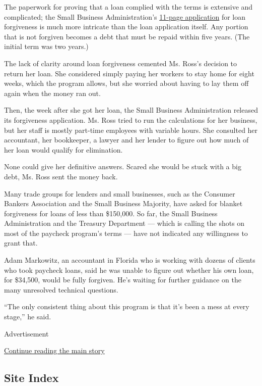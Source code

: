The paperwork for proving that a loan complied with the terms is
extensive and complicated; the Small Business Administration's
\href{https://www.sba.gov/sites/default/files/2020-05/3245-0407\%20SBA\%20Form\%203508\%20PPP\%20Forgiveness\%20Application.pdf}{11-page
application} for loan forgiveness is much more intricate than the loan
application itself. Any portion that is not forgiven becomes a debt that
must be repaid within five years. (The initial term was two years.)

The lack of clarity around loan forgiveness cemented Ms. Ross's decision
to return her loan. She considered simply paying her workers to stay
home for eight weeks, which the program allows, but she worried about
having to lay them off again when the money ran out.

Then, the week after she got her loan, the Small Business Administration
released its forgiveness application. Ms. Ross tried to run the
calculations for her business, but her staff is mostly part-time
employees with variable hours. She consulted her accountant, her
bookkeeper, a lawyer and her lender to figure out how much of her loan
would qualify for elimination.

None could give her definitive answers. Scared she would be stuck with a
big debt, Ms. Ross sent the money back.

Many trade groups for lenders and small businesses, such as the Consumer
Bankers Association and the Small Business Majority, have asked for
blanket forgiveness for loans of less than \$150,000. So far, the Small
Business Administration and the Treasury Department --- which is calling
the shots on most of the paycheck program's terms --- have not indicated
any willingness to grant that.

Adam Markowitz, an accountant in Florida who is working with dozens of
clients who took paycheck loans, said he was unable to figure out
whether his own loan, for \$34,500, would be fully forgiven. He's
waiting for further guidance on the many unresolved technical questions.

``The only consistent thing about this program is that it's been a mess
at every stage,'' he said.

Advertisement

\protect\hyperlink{after-bottom}{Continue reading the main story}

\hypertarget{site-index}{%
\subsection{Site Index}\label{site-index}}

